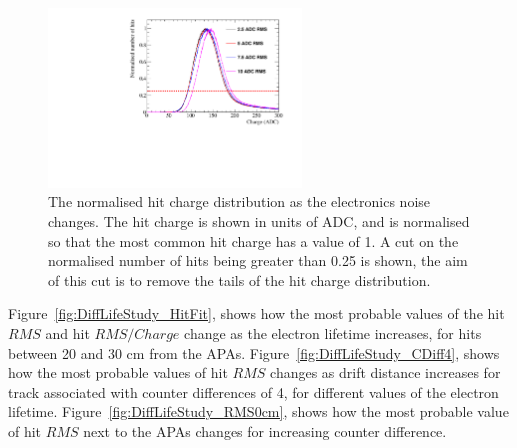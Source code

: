\begin{figure}[h!]
  \centering
  \includegraphics[width=0.6\textwidth]{Canvas_ChargeCut_NoiseLevel}
  \caption[The normalised hit charge distribution as the electronics noise changes]
          {The normalised hit charge distribution as the electronics noise changes. The hit charge is shown in units of ADC, and is normalised so that the most common hit charge has a value of 1. A cut on the normalised number of hits being greater than 0.25 is shown, the aim of this cut is to remove the tails of the hit charge distribution.}
  \label{fig:DiffNoiseStudy_ChargeCut}
\end{figure}

Figure~\ref{fig:DiffLifeStudy_HitFit}, shows how the most probable values of the hit $RMS$ and hit $RMS/Charge$ change as the electron lifetime increases, for hits between 20 and 30 cm from the APAs. Figure~\ref{fig:DiffLifeStudy_CDiff4}, shows how the most probable values of hit $RMS$ changes as drift distance increases for track associated with counter differences of 4, for different values of the electron lifetime. Figure~\ref{fig:DiffLifeStudy_RMS0cm}, shows how the most probable value of hit $RMS$ next to the APAs changes for increasing counter difference. \\ 

